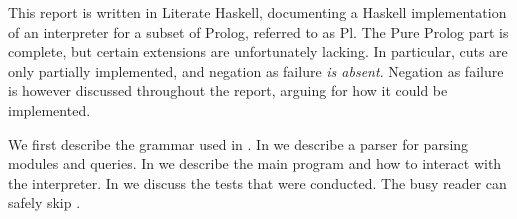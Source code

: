 This report is written in Literate Haskell, documenting a Haskell
implementation of an interpreter for a subset of Prolog, referred to as Pl. The
Pure Prolog part is complete, but certain extensions are unfortunately lacking.
In particular, cuts are only partially implemented, and negation as failure
\emph{is absent}. Negation as failure is however discussed throughout the
report, arguing for how it could be implemented.

We first describe the grammar used in . In
 we describe a parser for parsing modules and queries.
In  we describe the main program and how to interact with
the interpreter. In  we discuss the tests that were
conducted. The busy reader can safely skip .
